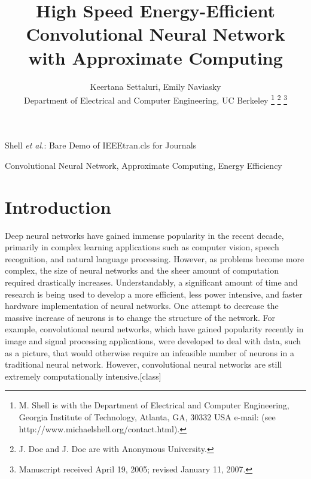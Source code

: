 \documentclass[journal]{IEEEtran}
\begin{document}
%
\title{High Speed Energy-Efficient Convolutional Neural Network with Approximate Computing}

\author{Keertana Settaluri,
        Emily Naviasky\\%
        Department of Electrical and Computer Engineering, UC Berkeley
\thanks{M. Shell is with the Department
of Electrical and Computer Engineering, Georgia Institute of Technology, Atlanta,
GA, 30332 USA e-mail: (see http://www.michaelshell.org/contact.html).}%
\thanks{J. Doe and J. Doe are with Anonymous University.}%
\thanks{Manuscript received April 19, 2005; revised January 11, 2007.}}

%
{Shell \MakeLowercase{\textit{et al.}}: Bare Demo of IEEEtran.cls for Journals}

\maketitle


\begin{abstract}
\blindtext[1]
\end{abstract}

\begin{IEEEkeywords}
Convolutional Neural Network, Approximate Computing, Energy Efficiency
\end{IEEEkeywords}

\IEEEpeerreviewmaketitle

\section{Introduction}
\indent Deep neural networks have gained immense popularity in the recent decade, primarily in complex learning applications such as computer vision, speech recognition, and natural language processing. However, as problems become more complex, the size of neural networks and the sheer amount of computation required drastically increases. Understandably, a significant amount of time and research is being used to develop a more efficient, less power intensive, and faster hardware implementation of neural networks. One attempt to decrease the massive increase of neurons is to change the structure of the network. For example, convolutional neural networks, which have gained popularity recently in image and signal processing applications, were developed to deal with data, such as a picture, that would otherwise require an infeasible number of neurons in a traditional neural network. However, convolutional neural networks are still extremely computationally intensive.[class] \\
	
\end{document}

